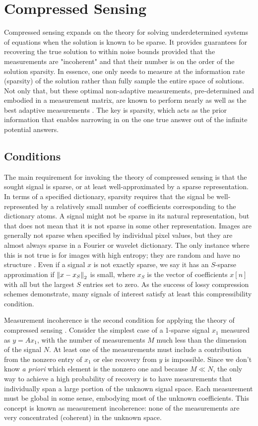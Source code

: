 \section{Compressed Sensing}
\label{compressed_sensing}
Compressed sensing \autocite{Don06a, CW08} expands on the theory for solving underdetermined systems of equations when the solution is known to be sparse. It provides guarantees for recovering the true solution to within noise bounds provided that the measurements are "incoherent" and that their number is on the order of the solution sparsity. In essence, one only needs to measure at the information rate (sparsity) of the solution rather than fully sample the entire space of solutions. Not only that, but these optimal non-adaptive measurements, pre-determined and embodied in a measurement matrix, are known to perform nearly as well as the best adaptive measurements \autocite{Don06a}. The key is sparsity, which acts as the prior information that enables narrowing in on the one true answer out of the infinite potential answers.

\subsection{Conditions}
The main requirement for invoking the theory of compressed sensing is that the sought signal is sparse, or at least well-approximated by a sparse representation. In terms of a specified dictionary, sparsity requires that the signal be well-represented by a relatively small number of coefficients corresponding to the dictionary atoms. A signal might not be sparse in its natural representation, but that does not mean that it is not sparse in some other representation. Images are generally not sparse when specified by individual pixel values, but they are almost always sparse in a Fourier or wavelet dictionary. The only instance where this is not true is for images with high entropy; they are random and have no structure \autocite{Mal08}. Even if a signal $x$ is not exactly sparse, we say it has an $S$-sparse approximation if $\norm{2}{x - x_S}$ is small, where $x_S$ is the vector of coefficients $x[n]$ with all but the largest $S$ entries set to zero. As the success of lossy compression schemes demonstrate, many signals of interest satisfy at least this compressibility condition.

Measurement incoherence is the second condition for applying the theory of compressed sensing \autocite{CW08}. Consider the simplest case of a 1-sparse signal $x_1$ measured as $y=Ax_1$, with the number of measurements $M$ much less than the dimension of the signal $N$. At least one of the measurements must include a contribution from the nonzero entry of $x_1$ or else recovery from $y$ is impossible. Since we don't know \emph{a priori} which element is the nonzero one and because $M \ll N$, the only way to achieve a high probability of recovery is to have measurements that individually span a large portion of the unknown signal space. Each measurement must be global in some sense, embodying most of the unknown coefficients. This concept is known as measurement incoherence: none of the measurements are very concentrated (coherent) in the unknown space.

